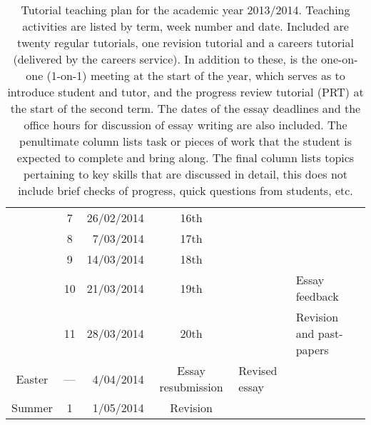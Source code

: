 \begin{table}
\begin{tabular}{c c r c l l}
			 & \hphantom{0}7 &	26/02/2014 & 16th		&			& \\
			 & \hphantom{0}8 &	 7/03/2014 & 17th		&			& \\
			 & \hphantom{0}9 &	14/03/2014 & 18th		&			& \\
			 & 10		 &	21/03/2014 & 19th		&			& Essay feedback \\
			 & 11		 &	28/03/2014 & 20th		&			& Revision and past-papers \\
\midrule
\multirow{1}{*}{Easter} & \multicolumn{1}{c}{---} & 4/04/2014 & Essay resubmission & Revised essay	& \\
\midrule
\multirow{1}{*}{Summer}	 & \hphantom{0}1 &	 1/05/2014 & Revision		&			& \\
 \bottomrule
\end{tabular}
\caption{Tutorial teaching plan for the academic year 2013/2014. Teaching activities are listed by term, week number and date. Included are twenty regular tutorials, one revision tutorial and a careers tutorial (delivered by the careers service). In addition to these, is the one-on-one (1-on-1) meeting at the start of the year, which serves as to introduce student and tutor, and the progress review tutorial (PRT) at the start of the second term. The dates of the essay deadlines and the office hours for discussion of essay writing are also included. The penultimate column lists task or pieces of work that the student is expected to complete and bring along. The final column lists topics pertaining to key skills that are discussed in detail, this does not include brief checks of progress, quick questions from students, etc.}\label{tab:2013-14}
\end{table}
